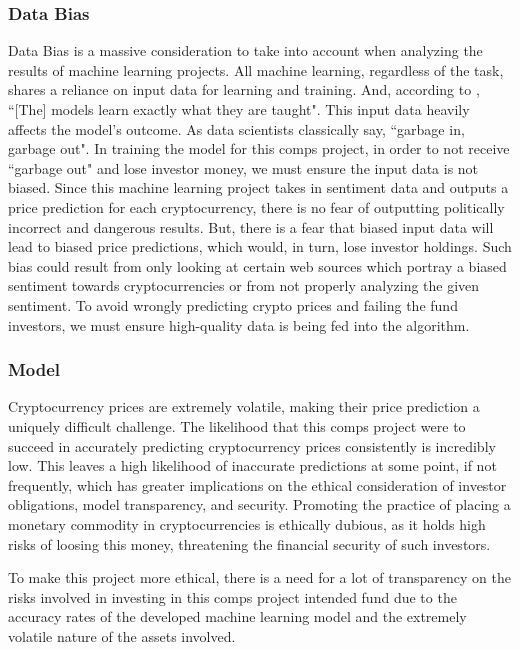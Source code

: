 \documentclass[10pt,twocolumn]{article}
\begin{document}
\subsubsection{Data Bias}

Data Bias is a massive consideration to take into account when analyzing the results of machine learning projects. All machine learning, regardless of the task, shares a reliance on input data for learning and training. And, according to , ``[The] models learn exactly what they are taught". This input data heavily affects the model's outcome. As data scientists classically say, ``garbage in, garbage out". In training the model for this comps project, in order to not receive ``garbage out" and lose investor money, we must ensure the input data is not biased. Since this machine learning project takes in sentiment data and outputs a price prediction for each cryptocurrency, there is no fear of outputting politically incorrect and dangerous results. But, there is a fear that biased input data will lead to biased price predictions, which would, in turn, lose investor holdings. Such bias could result from only looking at certain web sources which portray a biased sentiment towards cryptocurrencies or from not properly analyzing the given sentiment. To avoid wrongly predicting crypto prices and failing the fund investors, we must ensure high-quality data is being fed into the algorithm.

\subsubsection{Model}

Cryptocurrency prices are extremely volatile, making their price prediction a uniquely difficult challenge. The likelihood that this comps project were to succeed in accurately predicting cryptocurrency prices consistently is incredibly low. This leaves a high likelihood  of inaccurate predictions at some point, if not frequently, which has greater implications on the ethical consideration of investor obligations, model transparency, and security. Promoting the practice of placing a monetary commodity in cryptocurrencies is ethically dubious, as it holds high risks of loosing this money, threatening the financial security of such investors.

To make this project more ethical, there is a need for a lot of transparency on the risks involved in investing in this comps project intended fund due to the accuracy rates of the developed machine learning model and the extremely volatile nature of the assets involved.
\end{document}
